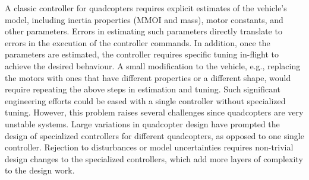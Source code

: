 
A classic controller for quadcopters requires explicit estimates of the vehicle's model, including inertia properties (MMOI and mass), motor constants, and other parameters.
%
Errors in estimating such parameters directly translate to errors in the execution of the controller commands.
%
In addition, once the parameters are estimated, the controller requires specific tuning in-flight to achieve the desired behaviour.
%
%
%
A small modification to the vehicle, e.g., replacing the motors with ones that have different properties or a different shape, would require repeating the above steps in estimation and tuning.
%
Such significant engineering efforts could be eased with a single controller without specialized tuning. However, this problem raises several challenges since quadcopters are very unstable systems. 
%
Large variations in quadcopter design have prompted the design of specialized controllers for different quadcopters, as opposed to one single controller. 
%
Rejection to disturbances or model uncertainties requires non-trivial design changes to the specialized controllers, which add more layers of complexity to the design work.
%


